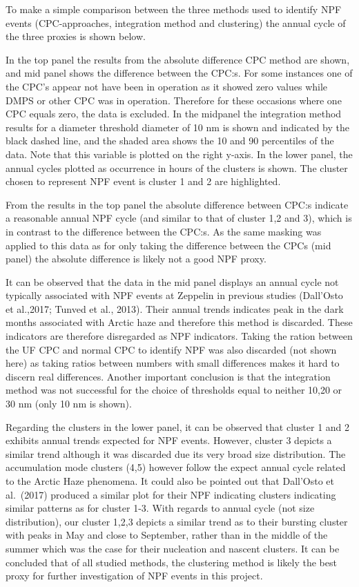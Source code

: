 \documentclass[11pt]{article}
\begin{document}
To make a simple comparison between the three methods used to identify
NPF events (CPC-approaches, integration method and clustering) the
annual cycle of the three proxies is shown below.

In the top panel the results from the absolute difference CPC method are
shown, and mid panel shows the difference between the CPC:s. For some
instances one of the CPC's appear not have been in operation as it
showed zero values while DMPS or other CPC was in operation. Therefore
for these occasions where one CPC equals zero, the data is excluded. In
the midpanel the integration method results for a diameter threshold
diameter of 10 nm is shown and indicated by the black dashed line, and
the shaded area shows the 10 and 90 percentiles of the data. Note that
this variable is plotted on the right y-axis. In the lower panel, the
annual cycles plotted as occurrence in hours of the clusters is shown.
The cluster chosen to represent NPF event is cluster 1 and 2 are
highlighted.

From the results in the top panel the absolute difference between CPC:s
indicate a reasonable annual NPF cycle (and similar to that of cluster
1,2 and 3), which is in contrast to the difference between the CPC:s. As
the same masking was applied to this data as for only taking the
difference between the CPCs (mid panel) the absolute difference is
likely not a good NPF proxy.

It can be observed that the data in the mid panel displays an annual
cycle not typically associated with NPF events at Zeppelin in previous
studies (Dall'Osto et al.,2017; Tunved et al., 2013). Their annual
trends indicates peak in the dark months associated with Arctic haze and
therefore this method is discarded. These indicators are therefore
disregarded as NPF indicators. Taking the ration between the UF CPC and
normal CPC to identify NPF was also discarded (not shown here) as taking
ratios between numbers with small differences makes it hard to discern
real differences. Another important conclusion is that the integration
method was not successful for the choice of thresholds equal to neither
10,20 or 30 nm (only 10 nm is shown).

Regarding the clusters in the lower panel, it can be observed that
cluster 1 and 2 exhibits annual trends expected for NPF events. However,
cluster 3 depicts a similar trend although it was discarded due its very
broad size distribution. The accumulation mode clusters (4,5) however
follow the expect annual cycle related to the Arctic Haze phenomena. It
could also be pointed out that Dall'Osto et al.~(2017) produced a
similar plot for their NPF indicating clusters indicating similar
patterns as for cluster 1-3. With regards to annual cycle (not size
distribution), our cluster 1,2,3 depicts a similar trend as to their
bursting cluster with peaks in May and close to September, rather than
in the middle of the summer which was the case for their nucleation and
nascent clusters. It can be concluded that of all studied methods, the
clustering method is likely the best proxy for further investigation of
NPF events in this project.
\end{document}
